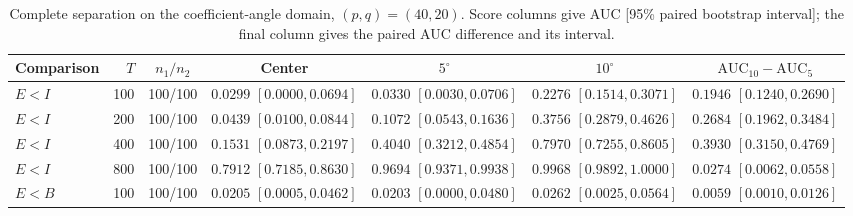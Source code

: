 \documentclass[12pt,letterpaper]{article}
\def\spacingset#1{\renewcommand{\baselinestretch}{#1}\small\normalsize}
\theoremstyle{plain}
\theoremstyle{definition}
\begin{document}
\begin{table}[p]
\begingroup
\spacingset{1.0}
\small\centering
\caption{Complete separation on the coefficient-angle domain, $(p,q)=(40,20)$. Score columns give AUC [95\% paired bootstrap interval]; the final column gives the paired AUC difference and its interval.}
\label{s23:lambda:allauc:p40q20}
\footnotesize
\setlength{\tabcolsep}{3.5pt}
\renewcommand{\arraystretch}{1.10}
\begin{adjustbox}{max width=\linewidth}
\begin{tabular}{lrccccc}
\toprule
Comparison & $T$ & $n_1/n_2$ & Center & $5^\circ$ & $10^\circ$ & $\mathrm{AUC}_{10}-\mathrm{AUC}_{5}$\\
\midrule
$E<I$ & 100 & 100/100 & \shortstack{$0.0299$\\{\scriptsize$[0.0000,0.0694]$}} & \shortstack{$0.0330$\\{\scriptsize$[0.0030,0.0706]$}} & \shortstack{$0.2276$\\{\scriptsize$[0.1514,0.3071]$}} & \shortstack{$0.1946$\\{\scriptsize$[0.1240,0.2690]$}}\\
$E<I$ & 200 & 100/100 & \shortstack{$0.0439$\\{\scriptsize$[0.0100,0.0844]$}} & \shortstack{$0.1072$\\{\scriptsize$[0.0543,0.1636]$}} & \shortstack{$0.3756$\\{\scriptsize$[0.2879,0.4626]$}} & \shortstack{$0.2684$\\{\scriptsize$[0.1962,0.3484]$}}\\
$E<I$ & 400 & 100/100 & \shortstack{$0.1531$\\{\scriptsize$[0.0873,0.2197]$}} & \shortstack{$0.4040$\\{\scriptsize$[0.3212,0.4854]$}} & \shortstack{$0.7970$\\{\scriptsize$[0.7255,0.8605]$}} & \shortstack{$0.3930$\\{\scriptsize$[0.3150,0.4769]$}}\\
$E<I$ & 800 & 100/100 & \shortstack{$0.7912$\\{\scriptsize$[0.7185,0.8630]$}} & \shortstack{$0.9694$\\{\scriptsize$[0.9371,0.9938]$}} & \shortstack{$0.9968$\\{\scriptsize$[0.9892,1.0000]$}} & \shortstack{$0.0274$\\{\scriptsize$[0.0062,0.0558]$}}\\
\addlinespace
$E<B$ & 100 & 100/100 & \shortstack{$0.0205$\\{\scriptsize$[0.0005,0.0462]$}} & \shortstack{$0.0203$\\{\scriptsize$[0.0000,0.0480]$}} & \shortstack{$0.0262$\\{\scriptsize$[0.0025,0.0564]$}} & \shortstack{$0.0059$\\{\scriptsize$[0.0010,0.0126]$}}\\

\end{tabular}
\end{adjustbox}
\end{table}
\end{document}
